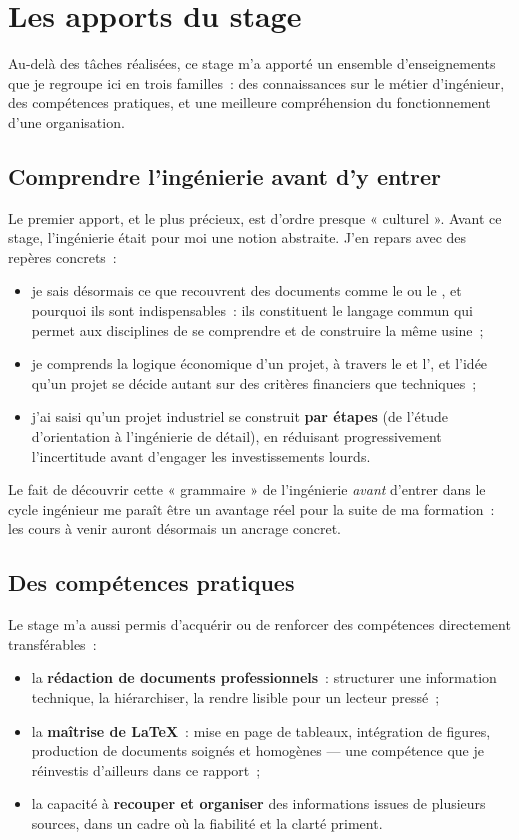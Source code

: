 \chapter{Les apports du stage}
\label{chap:apports}

Au-delà des tâches réalisées, ce stage m'a apporté un ensemble d'enseignements que je regroupe ici en trois familles~: des connaissances sur le métier d'ingénieur, des compétences pratiques, et une meilleure compréhension du fonctionnement d'une organisation.

\section{Comprendre l'ingénierie avant d'y entrer}

Le premier apport, et le plus précieux, est d'ordre presque « culturel ». Avant ce stage, l'ingénierie était pour moi une notion abstraite. J'en repars avec des repères concrets~:

\begin{itemize}
\item je sais désormais ce que recouvrent des documents comme le  ou le , et pourquoi ils sont indispensables~: ils constituent le langage commun qui permet aux disciplines de se comprendre et de construire la même usine~;
\item je comprends la logique économique d'un projet, à travers le  et l', et l'idée qu'un projet se décide autant sur des critères financiers que techniques~;
\item j'ai saisi qu'un projet industriel se construit \textbf{par étapes} (de l'étude d'orientation à l'ingénierie de détail), en réduisant progressivement l'incertitude avant d'engager les investissements lourds.
\end{itemize}

Le fait de découvrir cette « grammaire » de l'ingénierie \emph{avant} d'entrer dans le cycle ingénieur me paraît être un avantage réel pour la suite de ma formation~: les cours à venir auront désormais un ancrage concret.

\section{Des compétences pratiques}

Le stage m'a aussi permis d'acquérir ou de renforcer des compétences directement transférables~:

\begin{itemize}
\item la \textbf{rédaction de documents professionnels}~: structurer une information technique, la hiérarchiser, la rendre lisible pour un lecteur pressé~;
\item la \textbf{maîtrise de \LaTeX}~: mise en page de tableaux, intégration de figures, production de documents soignés et homogènes --- une compétence que je réinvestis d'ailleurs dans ce rapport~;
\item la capacité à \textbf{recouper et organiser} des informations issues de plusieurs sources, dans un cadre où la fiabilité et la clarté priment.
\end{itemize}

